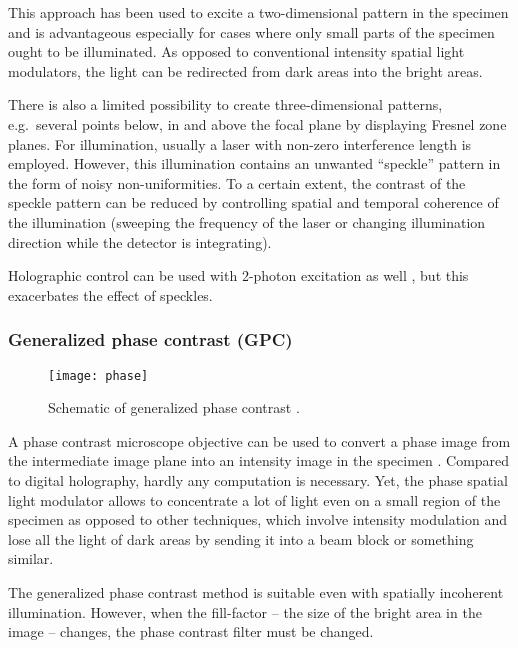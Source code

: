 
This approach has been used to excite a two-dimensional pattern in the
specimen \citep{Lutz2008,Zahid2010} and is advantageous especially for
cases where only small parts of the specimen ought to be
illuminated. As opposed to conventional intensity spatial light
modulators, the light can be redirected from dark areas into the
bright areas.

There is also a limited possibility to create three-dimensional
patterns, e.g.\ several points below, in and above the focal plane by
displaying Fresnel zone planes.  For illumination, usually a laser
with non-zero interference length is employed. However, this
illumination contains an unwanted ``speckle'' pattern in the form of
noisy non-uniformities. To a certain extent, the contrast of the
speckle pattern can be reduced by controlling spatial and temporal
coherence of the illumination (sweeping the frequency of the laser or
changing illumination direction while the detector is integrating).

Holographic control can be used with 2-photon excitation as well
\citep{Nikolenko2008}, %
but this exacerbates the effect of speckles.
\subsubsection{Generalized phase contrast (GPC)}
\begin{figure}[!hbt]
  \centering
  \texttt{[image: phase]} %
  \caption{Schematic of generalized phase contrast
    \citep[from][]{Rodrigo2008}.}
  \label{fig:phase}
\end{figure}
A phase contrast microscope objective  can be used to
convert a phase image from the intermediate image plane into an
intensity image in the specimen \citep{Rodrigo2008}. Compared to digital holography, hardly any computation is
necessary. Yet, the phase spatial light modulator allows to
concentrate a lot of light even on a small region of the specimen as
opposed to other techniques, which involve intensity modulation and
lose all the light of dark areas by sending it into a beam block or
something similar.

The generalized phase contrast method is suitable even with spatially
incoherent illumination. However, when the
fill-factor -- the size of the bright area in the image -- changes,
the phase contrast filter must be changed.
